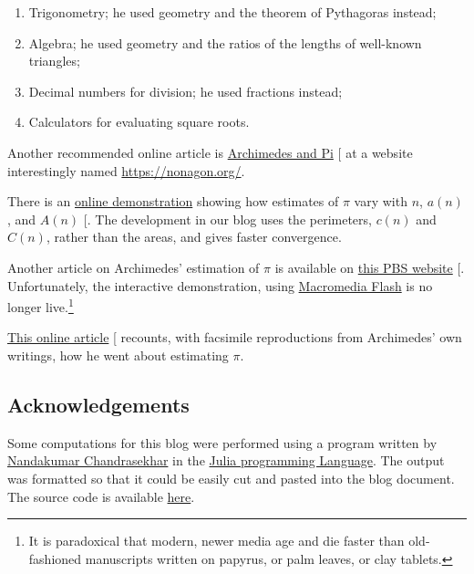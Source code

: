 \documentclass[
  a4paper,
]{article}
\begin{document}
\begin{enumerate}
\item
  Trigonometry; he used geometry and the theorem of Pythagoras instead;
\item
  Algebra; he used geometry and the ratios of the lengths of well-known
  triangles;
\item
  Decimal numbers for division; he used fractions instead;
\item
  Calculators for evaluating square roots.
\end{enumerate}

Another recommended online article is
\href{https://nonagon.org/ExLibris/archimedes-pi}{Archimedes and Pi}
{[}\citeproc{ref-bertrand2014}{1}{]} at a website interestingly named
\href{https://nonagon.org/}{\textsf{https://nonagon.org/}}.

There is an
\href{https://demonstrations.wolfram.com/ArchimedesApproximationOfPi/\#more}{online
demonstration} showing how estimates of \(\pi\) vary with \(n\),
\(a(n)\), and \(A(n)\) {[}\citeproc{ref-tucker2009}{10}{]}. The
development in our blog uses the perimeters, \(c(n)\) and \(C(n)\),
rather than the areas, and gives faster convergence.

Another article on Archimedes' estimation of \(\pi\) is available on
\href{ttps://www.pbs.org/wgbh/nova/physics/approximating-pi.html}{this
PBS website} {[}\citeproc{ref-groleau2003}{11}{]}. Unfortunately, the
interactive demonstration, using
\href{https://en.wikipedia.org/wiki/Adobe_Flash}{Macromedia Flash} is no
longer live.\footnote{It is paradoxical that modern, newer media age and
  die faster than old-fashioned manuscripts written on papyrus, or palm
  leaves, or clay tablets.}

\href{https://mathsciencehistory.com/2019/10/01/archimedes-and-his-pi-the-great-numerical-hope/}{This
online article} {[}\citeproc{ref-birchak2019}{12}{]} recounts, with
facsimile reproductions from Archimedes' own writings, how he went about
estimating \(\pi\).

\subsection{Acknowledgements}\label{acknowledgements}

Some computations for this blog were performed using a program written
by
\href{https://www.linkedin.com/in/nandakumar-chandrasekhar-a400b45b/}{Nandakumar
Chandrasekhar} in the \href{https://julialang.org/}{Julia programming
Language}. The output was formatted so that it could be easily cut and
pasted into the blog document. The source code is available
\href{auxiliary/pi_approximations.jl}{here}.
\end{document}
